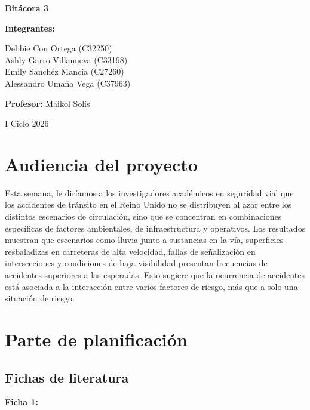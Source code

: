 \documentclass[12pt]{article}
\begin{document}
\begin{titlepage}
\centering
\vspace*{\fill}

{\Huge\bfseries Bitácora 3\par}
\vspace{1.5cm}

{\Large\textbf{Integrantes:}\par}
Debbie Con Ortega (C32250)\\
Ashly Garro Villanueva (C33198)\\
Emily Sanchéz Mancía (C27260)\\
Alessandro Umaña Vega (C37963)

\vspace{1cm}

{\Large\textbf{Profesor:} Maikol Solís\par}
\vspace{1.5cm}

{\Large I Ciclo 2026\par}

\vspace*{\fill}
\end{titlepage}
\tableofcontents
\newpage

\section{Audiencia del proyecto} 
Esta semana, le diríamos a los investigadores académicos en seguridad vial que 
los accidentes de tránsito en el Reino Unido no 
se distribuyen al azar entre los distintos escenarios de circulación, 
sino que se concentran en combinaciones específicas de factores ambientales, 
de infraestructura y operativos. Los resultados muestran que escenarios como 
lluvia junto a sustancias en la vía, superficies resbaladizas en carreteras de 
alta velocidad, fallas de señalización en intersecciones y condiciones de baja 
visibilidad presentan frecuencias de accidentes superiores a las esperadas. 
Esto sugiere que la ocurrencia de accidentes está asociada a la interacción entre 
varios factores de riesgo, más que a solo una situación de riesgo.


\section{Parte de planificación}
\subsection{Fichas de literatura}
\textbf{Ficha 1:}
\end{document}
